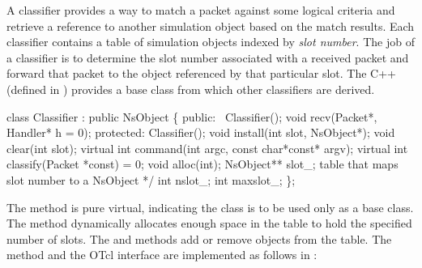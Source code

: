 A classifier provides a way to match a packet against some
logical criteria and retrieve a reference to another simulation
object based on the match results.
Each classifier contains a table of simulation objects indexed
by {\em slot number}.
The job of a classifier is to determine the slot number associated
with a received packet and forward that packet to the
object referenced by that particular slot.
The C++ 
(defined in )
provides a base class from which other classifiers are derived.
\begin{program}
        class Classifier : public NsObject \{
        public:
                ~Classifier();
                void recv(Packet*, Handler* h = 0);
         protected:
                Classifier();
                void install(int slot, NsObject*);
                void clear(int slot);
                virtual int command(int argc, const char*const* argv);
                virtual int classify(Packet *const) = 0;
                void alloc(int);
                NsObject** slot_;       \* table that maps slot number to a NsObject */
                int nslot_;
                int maxslot_;
        \};
\end{program}
The  method is pure virtual, indicating the
class  is to be used only as a base class.
The  method dynamically allocates enough space
in the table to hold the specified number of slots.
The  and  methods
add or remove objects from the table.
The  method and the OTcl interface are implemented
as follows in :
